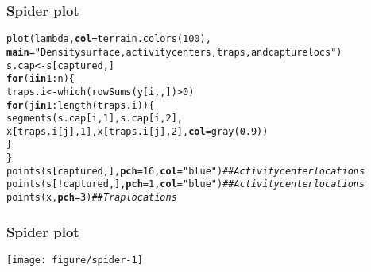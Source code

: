 \documentclass[color=usenames,dvipsnames]{beamer}\usepackage[]{graphicx}\usepackage[]{color}
\makeatletter
\newcommand{\hlnum}[1]{\textcolor[rgb]{0.69,0.494,0}{#1}}%
\newcommand{\hlstr}[1]{\textcolor[rgb]{0.749,0.012,0.012}{#1}}%
\newcommand{\hlcom}[1]{\textcolor[rgb]{0.514,0.506,0.514}{\textit{#1}}}%
\newcommand{\hlopt}[1]{\textcolor[rgb]{0,0,0}{#1}}%
\newcommand{\hlstd}[1]{\textcolor[rgb]{0,0,0}{#1}}%
\newcommand{\hlkwa}[1]{\textcolor[rgb]{0,0,0}{\textbf{#1}}}%
\newcommand{\hlkwb}[1]{\textcolor[rgb]{0,0.341,0.682}{#1}}%
\newcommand{\hlkwc}[1]{\textcolor[rgb]{0,0,0}{\textbf{#1}}}%
\newcommand{\hlkwd}[1]{\textcolor[rgb]{0.004,0.004,0.506}{#1}}%
\newenvironment{kframe}{%
 \def\at@end@of@kframe{}%
 \ifinner\ifhmode%
  \def\at@end@of@kframe{\end{minipage}}%
  \begin{minipage}{\columnwidth}%
 \fi\fi%
 \def\FrameCommand##1{\hskip\@totalleftmargin \hskip-\fboxsep
 \colorbox{shadecolor}{##1}\hskip-\fboxsep
     \hskip-\linewidth \hskip-\@totalleftmargin \hskip\columnwidth}%
 \MakeFramed {\advance\hsize-\width
   \@totalleftmargin\z@ \linewidth\hsize
   \@setminipage}}%
 {\par\unskip\endMakeFramed%
 \at@end@of@kframe}
\newenvironment{knitrout}{}{} %
\makeatother
\begin{document}
\begin{frame}[fragile]
  \frametitle{Spider plot}
\begin{knitrout}\scriptsize
{}\color{fgcolor}\begin{kframe}
\begin{alltt}
\hlkwd{plot}\hlstd{(lambda,} \hlkwc{col}\hlstd{=}\hlkwd{terrain.colors}\hlstd{(}\hlnum{100}\hlstd{),}
     \hlkwc{main}\hlstd{=}\hlstr{"Density surface, activity centers, traps, and capture locs"}\hlstd{)}
\hlstd{s.cap} \hlkwb{<-} \hlstd{s[captured,]}
\hlkwa{for}\hlstd{(i} \hlkwa{in} \hlnum{1}\hlopt{:}\hlstd{n) \{}
    \hlstd{traps.i} \hlkwb{<-} \hlkwd{which}\hlstd{(}\hlkwd{rowSums}\hlstd{(y[i,,])}\hlopt{>}\hlnum{0}\hlstd{)}
    \hlkwa{for}\hlstd{(j} \hlkwa{in} \hlnum{1}\hlopt{:}\hlkwd{length}\hlstd{(traps.i)) \{}
        \hlkwd{segments}\hlstd{(s.cap[i,}\hlnum{1}\hlstd{], s.cap[i,}\hlnum{2}\hlstd{],}
                 \hlstd{x[traps.i[j],}\hlnum{1}\hlstd{], x[traps.i[j],}\hlnum{2}\hlstd{],} \hlkwc{col}\hlstd{=}\hlkwd{gray}\hlstd{(}\hlnum{0.9}\hlstd{))}
    \hlstd{\}}
\hlstd{\}}
\hlkwd{points}\hlstd{(s[captured,],} \hlkwc{pch}\hlstd{=}\hlnum{16}\hlstd{,} \hlkwc{col}\hlstd{=}\hlstr{"blue"}\hlstd{)} \hlcom{## Activity center locations}
\hlkwd{points}\hlstd{(s[}\hlopt{!}\hlstd{captured,],} \hlkwc{pch}\hlstd{=}\hlnum{1}\hlstd{,} \hlkwc{col}\hlstd{=}\hlstr{"blue"}\hlstd{)} \hlcom{## Activity center locations}
\hlkwd{points}\hlstd{(x,} \hlkwc{pch}\hlstd{=}\hlnum{3}\hlstd{)}              \hlcom{## Trap locations}
\end{alltt}
\end{kframe}
\end{knitrout}
\end{frame}


\begin{frame}
  \frametitle{Spider plot}
  \centering
  \texttt{[image: figure/spider-1]} \\
\end{frame}






\end{document}
